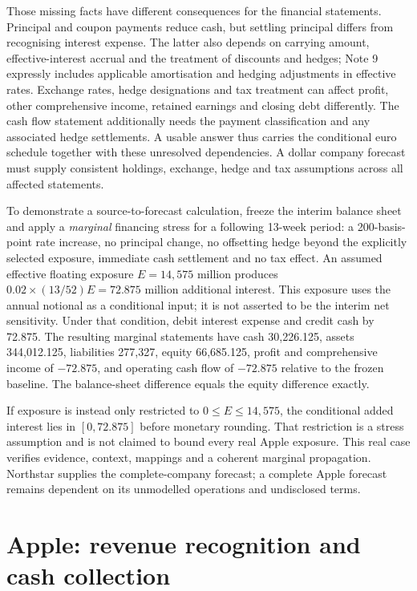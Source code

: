 Those missing facts have different consequences for the financial statements.
Principal and coupon payments reduce cash, but settling principal differs from
recognising interest expense. The latter also depends on carrying amount,
effective-interest accrual and the treatment of discounts and hedges; Note 9
expressly includes applicable amortisation and hedging adjustments in effective
rates. Exchange rates, hedge designations and tax treatment can affect profit,
other comprehensive income, retained earnings and closing debt differently.
The cash flow statement additionally needs the payment classification and any
associated hedge settlements. A usable answer thus carries the conditional
euro schedule together with these unresolved dependencies. A dollar company
forecast must supply consistent holdings, exchange, hedge and tax assumptions
across all affected statements.

To demonstrate a source-to-forecast calculation, freeze the interim balance
sheet and apply a \emph{marginal} financing stress for a following 13-week
period: a 200-basis-point rate increase, no principal change, no offsetting
hedge beyond the explicitly selected exposure, immediate cash settlement and
no tax effect. An assumed effective floating exposure $E=14{,}575$ million
produces $0.02\times(13/52)E=72.875$ million additional interest. This exposure
uses the annual notional as a conditional input; it is not asserted to be the
interim net sensitivity. Under that condition, debit interest expense and
credit cash by 72.875. The resulting marginal statements have cash 30,226.125,
assets 344,012.125, liabilities 277,327, equity 66,685.125, profit and comprehensive
income of $-72.875$, and operating cash flow of $-72.875$ relative to the frozen
baseline. The balance-sheet difference equals the equity difference exactly.

If exposure is instead only restricted to $0\leq E\leq14{,}575$, the
conditional added interest lies in $[0,72.875]$ before monetary rounding. That
restriction is a stress assumption and is not claimed to bound every real
Apple exposure. This real case verifies evidence, context, mappings and a
coherent marginal propagation. Northstar supplies the complete-company
forecast; a complete Apple forecast remains dependent on its unmodelled
operations and undisclosed terms.




\section{Apple: revenue recognition and cash collection}
\label{sec:apple-revenue}

